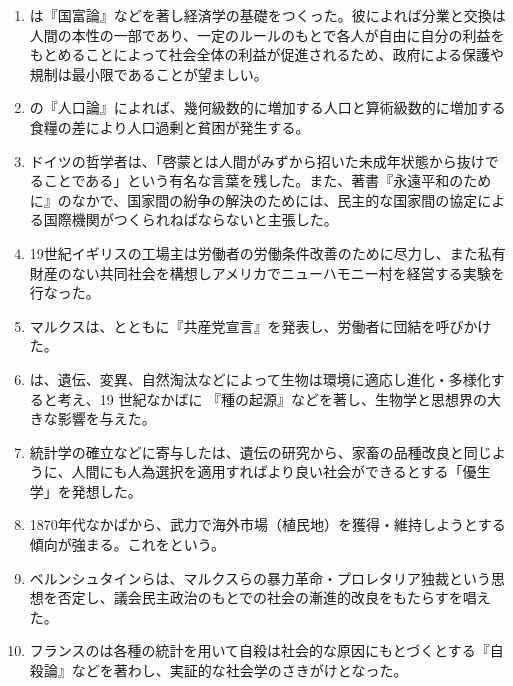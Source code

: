 \documentclass[uplatex,dvipdfmx]{jsarticle}
\begin{document}
\begin{enumerate}

\item {}は『国富論』などを著し経済学の基礎をつくった。彼によれば分業と交換は人間の本性の一部であり、一定のルールのもとで各人が自由に自分の利益をもとめることによって社会全体の利益が促進されるため、政府による保護や規制は最小限であることが望ましい。

\item {}の『人口論』によれば、幾何級数的に増加する人口と算術級数的に増加する食糧の差により人口過剰と貧困が発生する。
  
\item   ドイツの哲学者は、「啓蒙とは人間がみずから招いた未成年状態から抜けでることである」という有名な言葉を残した。また、著書『永遠平和のために』のなかで、国家間の紛争の解決のためには、民主的な国家間の協定による国際機関がつくられねばならないと主張した。

\item   19世紀イギリスの工場主は労働者の労働条件改善のために尽力し、また私有財産のない共同社会を構想しアメリカでニューハモニー村を経営する実験を行なった。

\item マルクスは、とともに『共産党宣言』を発表し、労働者に団結を呼びかけた。
  
\item   {}は、遺伝、変異、自然淘汰などによって生物は環境に適応し進化・多様化すると考え、19 世紀なかばに 『種の起源』などを著し、生物学と思想界の大きな影響を与えた。


\item   統計学の確立などに寄与したは、遺伝の研究から、家畜の品種改良と同じように、人間にも人為選択を適用すればより良い社会ができるとする「優生学」を発想した。

\item 1870年代なかばから、武力で海外市場（植民地）を獲得・維持しようとする傾向が強まる。これをという。


\item ベルンシュタインらは、マルクスらの暴力革命・プロレタリア独裁という思想を否定し、議会民主政治のもとでの社会の漸進的改良をもたらすを唱えた。


\item   フランスのは各種の統計を用いて自殺は社会的な原因にもとづくとする『自殺論』などを著わし、実証的な社会学のさきがけとなった。



\end{enumerate}
\end{document}
